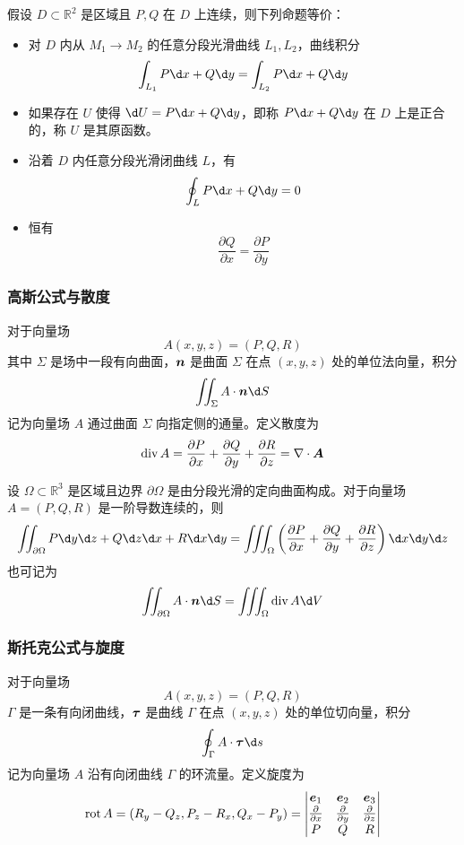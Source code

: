 \begin{theorem}[Green 定理]
	假设 $D \subset \mathbb{R}^2$ 是区域且 $P, Q$ 在 $D$ 上连续，则下列命题等价：

	\begin{itemize}
		\item 对 $D$ 内从 $M_1 \to M_2$ 的任意分段光滑曲线 $L_1, L_2$，曲线积分
		      \[ \int_{L_1} P \d x + Q \d y = \int_{L_2} P \d x + Q \d y \]
		\item 如果存在 $U$ 使得 $\d U = P \d x + Q \d y$，即称 $P \d x + Q \d y$ 在 $D$ 上是正合的，称 $U$ 是其原函数。
		\item 沿着 $D$ 内任意分段光滑闭曲线 $L$，有
		      \[ \oint_{L} P \d x + Q \d y = 0 \]
		\item 恒有
		      \[ \frac{\partial Q}{\partial x} = \frac{\partial P}{\partial y} \]
	\end{itemize}
\end{theorem}

\subsubsection*{高斯公式与散度}

对于向量场
\[ A(x, y, z) = (P, Q, R) \]
其中 $\Sigma$ 是场中一段有向曲面，$\boldsymbol{n}$ 是曲面 $\Sigma$ 在点 $(x, y, z)$ 处的单位法向量，积分
\[ \iint_{\Sigma} A \cdot \vbf{n} \d S  \]
记为向量场 $A$ 通过曲面 $\Sigma$ 向指定侧的通量。定义散度为
\[ \operatorname{div} A = \frac{\partial P}{\partial x} + \frac{\partial Q}{\partial y} + \frac{\partial R}{\partial z} = \nabla \cdot \boldsymbol{A} \]

\begin{theorem}[Gauss 公式]
	设 $\Omega \subset \mathbb{R}^3$ 是区域且边界 $\partial \Omega$ 是由分段光滑的定向曲面构成。对于向量场 $A = (P, Q, R)$ 是一阶导数连续的，则
	\[ \iint_{\partial \Omega} P \d y \d z + Q \d z \d x + R \d x \d y = \iiint_{\Omega} \left( \frac{\partial P}{\partial x} + \frac{\partial Q}{\partial y} + \frac{\partial R}{\partial z} \right) \d x \d y \d z \]
	也可记为
	\[ \iint_{\partial \Omega} A \cdot \vbf{n} \d S = \iiint_{\Omega} \operatorname{div} A \d V \]
\end{theorem}

\subsubsection*{斯托克公式与旋度}

对于向量场
\[ A(x, y, z) = (P, Q, R) \]
$\Gamma$ 是一条有向闭曲线，$\boldsymbol{\tau}$ 是曲线 $\Gamma$ 在点 $(x, y, z)$ 处的单位切向量，积分
\[ \oint_{\Gamma} A \cdot \vbf{\tau} \d s  \]
记为向量场 $A$ 沿有向闭曲线 $\Gamma$ 的环流量。定义旋度为
\[ \operatorname{rot} A = \left(R_y - Q_z, P_z - R_x, Q_x - P_y \right) = \left| \begin{matrix}
		\boldsymbol{e}_1                   & \boldsymbol{e}_2                   & \boldsymbol{e}_3                   \\
		\frac{\partial}{\partial x} & \frac{\partial}{\partial y} & \frac{\partial}{\partial z} \\
		P                           & Q                           & R
	\end{matrix} \right| \]


